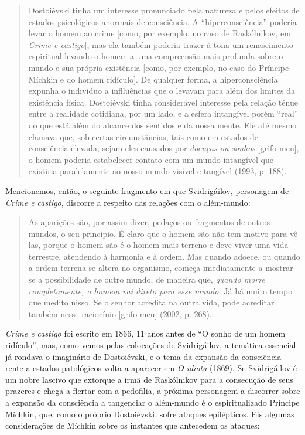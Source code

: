 \begin{quote}
Dostoiévski tinha um interesse pronunciado pela natureza e pelos efeitos
de estados psicológicos anormais de consciência. A ``hiperconsciência''
poderia levar o homem ao crime {[}como, por exemplo, no caso de
Raskólnikov, em \emph{Crime e castigo}{]}, mas ela também poderia trazer
à tona um renascimento espiritual levando o homem a uma compreensão mais
profunda sobre o mundo e sua própria existência {[}como, por exemplo, no
caso do Príncipe Míchkin e do homem ridículo{]}. De qualquer forma, a
hiperconsciência expunha o indivíduo a inflluências que o levavam para
além dos limites da existência física. Dostoiévski tinha considerável
interesse pela relação tênue entre a realidade cotidiana, por um lado, e
a esfera intangível porém ``real'' do que está além do alcance dos
sentidos e da nossa mente. Ele até mesmo clamava que, sob certas
circunstâncias, tais como em estados de consciência elevada, sejam eles
causados por \emph{doenças ou sonhos} {[}grifo meu{]}, o homem poderia
estabelecer contato com um mundo intangível que existiria paralelamente
ao nosso mundo visível e tangível (1993, p. 188).
\end{quote}

Mencionemos, então, o seguinte fragmento em que Svidrigáilov, personagem
de \emph{Crime e castigo}, discorre a respeito das relações com o
além-mundo:

\begin{quote}
As aparições são, por assim dizer, pedaços ou fragmentos de outros
mundos, o seu princípio. É claro que o homem são não tem motivo para
vê-las, porque o homem são é o homem mais terreno e deve viver uma vida
terrestre, atendendo à harmonia e à ordem. Mas quando adoece, ou quando
a ordem terrena se altera no organismo, começa imediatamente a
mostrar-se a possibilidade de outro mundo, de maneira que, \emph{quando
morre completamente, o homem vai direto para esse mundo.} Já há muito
tempo que medito nisso. Se o senhor acredita na outra vida, pode
acreditar também nesse raciocínio {[}grifo meu{]} (2002, p. 268).
\end{quote}

\emph{Crime e castigo} foi escrito em 1866, 11 anos antes de ``O sonho
de um homem ridículo'', mas, como vemos pelas colocações de
Svidrigáilov, a temática essencial já rondava o imaginário de
Dostoiévski, e o tema da expansão da consciência rente a estados
patológicos volta a aparecer em \emph{O idiota} (1869). Se Svidrigáilov
é um nobre lascivo que extorque a irmã de Raskólnikov para a consecução
de seus prazeres e chega a flertar com a pedofilia, a próxima personagem
a discorrer sobre a expansão da consciência a tangenciar o além-mundo é
o espiritualizado Príncipe Míchkin, que, como o próprio Dostoiévski,
sofre ataques epilépticos. Eis algumas considerações de Míchkin sobre os
instantes que antecedem os ataques:


